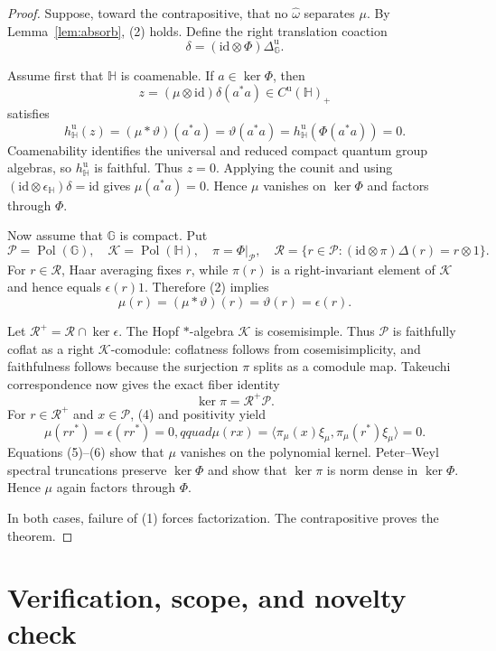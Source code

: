 \documentclass[11pt]{article}
\newcommand{\Pol}{\operatorname{Pol}}
\begin{document}
\begin{proof}
Suppose, toward the contrapositive, that no $\widehat\omega$ separates
$\mu$.  By Lemma~\ref{lem:absorb}, (2) holds.  Define the right translation
coaction
\[
 \delta=(\mathrm{id}\otimes\Phi)\Delta_{\mathbb G}^{\mathrm u}.
\]

Assume first that $\mathbb H$ is coamenable.  If $a\in\ker\Phi$, then
\[
 z=(\mu\otimes\mathrm{id})\delta(a^*a)\in C^{\mathrm u}(\mathbb H)_+
\]
satisfies
\[
 h_{\mathbb H}^{\mathrm u}(z)
  =(\mu*\vartheta)(a^*a)
  =\vartheta(a^*a)
  =h_{\mathbb H}^{\mathrm u}(\Phi(a^*a))=0.                    \tag{3}
\]
Coamenability identifies the universal and reduced compact quantum group
algebras, so $h_{\mathbb H}^{\mathrm u}$ is faithful.  Thus $z=0$.
Applying the counit and using
$(\mathrm{id}\otimes\epsilon_{\mathbb H})\delta=\mathrm{id}$ gives
$\mu(a^*a)=0$.  Hence $\mu$ vanishes on $\ker\Phi$ and factors through
$\Phi$.

Now assume that $\mathbb G$ is compact.  Put
\[
 \mathcal P=\Pol(\mathbb G),\quad
 \mathcal K=\Pol(\mathbb H),\quad
 \pi=\Phi|_{\mathcal P},\quad
 \mathcal R=\{r\in\mathcal P:(\mathrm{id}\otimes\pi)\Delta(r)=r\otimes1\}.
\]
For $r\in\mathcal R$, Haar averaging fixes $r$, while
$\pi(r)$ is a right-invariant element of $\mathcal K$ and hence equals
$\epsilon(r)1$.  Therefore (2) implies
\[
 \mu(r)=(\mu*\vartheta)(r)=\vartheta(r)=\epsilon(r).            \tag{4}
\]

Let $\mathcal R^+=\mathcal R\cap\ker\epsilon$.  The Hopf
$*$-algebra $\mathcal K$ is cosemisimple.  Thus $\mathcal P$ is faithfully
coflat as a right $\mathcal K$-comodule: coflatness follows from
cosemisimplicity, and faithfulness follows because the surjection $\pi$
splits as a comodule map.  Takeuchi correspondence \cite{Takeuchi} now gives
the exact fiber identity
\[
 \ker\pi=\mathcal R^+\mathcal P.                               \tag{5}
\]
For $r\in\mathcal R^+$ and $x\in\mathcal P$, (4) and positivity yield
\[
 \mu(rr^*)=\epsilon(rr^*)=0,qquad
 \mu(rx)=\langle\pi_\mu(x)\xi_\mu,
                    \pi_\mu(r^*)\xi_\mu\rangle=0.             \tag{6}
\]
Equations (5)--(6) show that $\mu$ vanishes on the polynomial kernel.
Peter--Weyl spectral truncations preserve $\ker\Phi$ and show that
$\ker\pi$ is norm dense in $\ker\Phi$.  Hence $\mu$ again factors through
$\Phi$.

In both cases, failure of (1) forces factorization.  The contrapositive proves
the theorem.
\end{proof}

\section*{Verification, scope, and novelty check}
\end{document}
